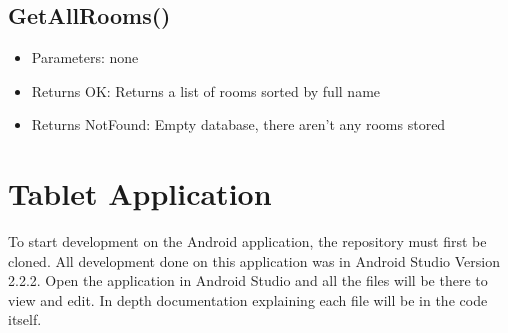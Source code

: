\subsection{GetAllRooms()}
\begin{itemize}
\item{Parameters}: none
\item{Returns OK}: Returns a list of rooms sorted by full name
\item{Returns NotFound}: Empty database, there aren't any rooms stored
\end{itemize}

\section{Tablet Application}
To start development on the Android application, the repository must first be cloned.  All development done on this application was in Android Studio Version 2.2.2.  Open the application in Android Studio and all the files will be there to view and edit.  In depth documentation explaining each file will be in the code itself.
